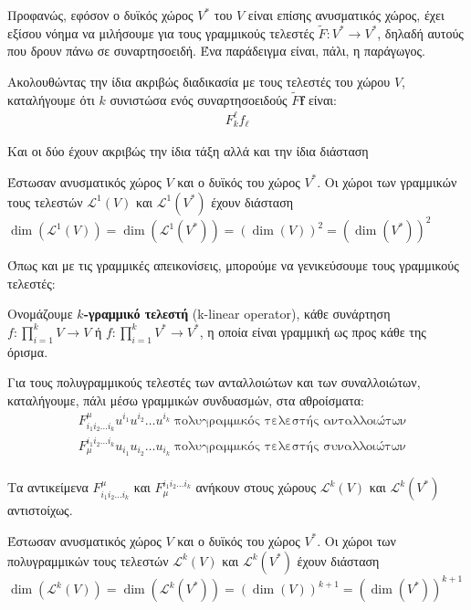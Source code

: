 \documentclass[main.tex]{subfiles}
\begin{document}
	Προφανώς, εφόσον ο δυϊκός χώρος $V^*$ του $V$ είναι επίσης ανυσματικός χώρος, έχει εξίσου νόημα να μιλήσουμε για τους γραμμικούς τελεστές ${\tilde{F}:V^*\rightarrow V^*}$, δηλαδή αυτούς που δρουν πάνω σε συναρτησοειδή. Ένα παράδειγμα είναι, πάλι, η παράγωγος.
	
	Ακολουθώντας την ίδια ακριβώς διαδικασία με τους τελεστές του χώρου $V$, καταλήγουμε ότι $k$ συνιστώσα ενός συναρτησοειδούς $\tilde{F}\boldsymbol{f}$ είναι:
	\begin{align*}
		F_k^\ell f_\ell
	\end{align*}

	Και οι δύο έχουν ακριβώς την ίδια τάξη αλλά και την ίδια διάσταση
	\begin{corollary}
		Έστωσαν ανυσματικός χώρος $V$ και ο δυϊκός του χώρος $V^*$. Οι χώροι των γραμμικών τους τελεστών $\mathcal{L}^1(V)$ και $\mathcal{L}^1(V^*)$ έχουν διάσταση $\dim(\mathcal{L}^1(V)) = \dim(\mathcal{L}^1(V^*)) = (\dim(V))^2 = (\dim(V^*))^2$
	\end{corollary}

	Όπως και με τις γραμμικές απεικονίσεις, μπορούμε να γενικεύσουμε τους γραμμικούς τελεστές:
	\begin{definition}
		Ονομάζουμε \textbf{$k$-γραμμικό τελεστή} (k-linear operator), κάθε συνάρτηση $f:\prod_{i=1}^{k}V\rightarrow V$ ή $f:\prod_{i=1}^{k}V^*\rightarrow V^*$, η οποία είναι γραμμική ως προς κάθε της όρισμα.
	\end{definition}

	Για τους πολυγραμμικούς τελεστές των ανταλλοιώτων και των συναλλοιώτων, καταλήγουμε, πάλι μέσω γραμμικών συνδυασμών, στα αθροίσματα:
	\begin{align*}
		&F^\mu_{i_1i_2\ldots i_k}u^{i_1}u^{i_2}\ldots u^{i_k} \; \text{πολυγραμμικός τελεστής ανταλλοιώτων} \\
		&F_\mu^{i_1i_2\ldots i_k}u_{i_1}u_{i_2}\ldots u_{i_k} \; \text{πολυγραμμικός τελεστής συναλλοιώτων} \\
	\end{align*}
	
	Τα αντικείμενα $F^\mu_{i_1i_2\ldots i_k}$ και $F_\mu^{i_1i_2\ldots i_k}$ ανήκουν στους χώρους $\mathcal{L}^k(V)$ και $\mathcal{L}^{k}(V^*)$ αντιστοίχως.
	
	\begin{corollary}
		Έστωσαν ανυσματικός χώρος $V$ και ο δυϊκός του χώρος $V^*$. Οι χώροι των πολυγραμμικών τους τελεστών $\mathcal{L}^k(V)$ και $\mathcal{L}^k(V^*)$ έχουν διάσταση $\dim(\mathcal{L}^k(V)) = \dim(\mathcal{L}^k(V^*)) = (\dim(V))^{k+1} = (\dim(V^*))^{k+1}$
	\end{corollary}
	
\end{document}
